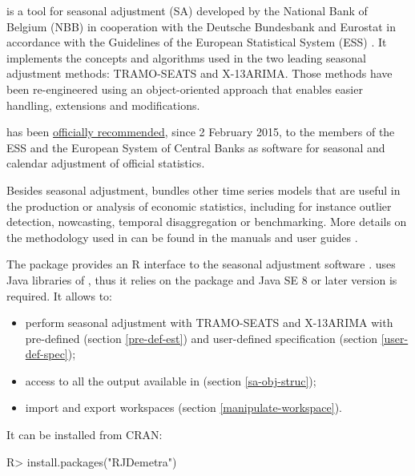 \documentclass[article]{jss}
\providecommand{\tightlist}{%
  \setlength{\itemsep}{0pt}\setlength{\parskip}{0pt}}
\begin{document}
 is a tool for seasonal adjustment (SA) developed by
the National Bank of Belgium (NBB) in cooperation with the Deutsche
Bundesbank and Eurostat in accordance with the Guidelines of the
European Statistical System (ESS) \citep{eurostat2015guidelines}. It
implements the concepts and algorithms used in the two leading seasonal
adjustment methods: TRAMO-SEATS and X-13ARIMA. Those methods have been
re-engineered using an object-oriented approach that enables easier
handling, extensions and modifications.

 has been
\href{https://ec.europa.eu/eurostat/cros/system/files/Jdemetra_\%20release.pdf}{officially
recommended}, since 2 February 2015, to the members of the ESS and the
European System of Central Banks as software for seasonal and calendar
adjustment of official statistics.

Besides seasonal adjustment,  bundles other time
series models that are useful in the production or analysis of economic
statistics, including for instance outlier detection, nowcasting,
temporal disaggregation or benchmarking. More details on the methodology
used in  can be found in the 
manuals and user guides
\citep{grudkowska2015jdemetrarm, grudkowska2015jdemetraug}.

The package  \citep{RJDemetra} provides an R interface to
the seasonal adjustment software . 
uses Java libraries of , thus it relies on the
 \citep{rJava} package and Java SE 8 or later version is
required. It allows to:

\begin{itemize}
\tightlist
\item
  perform seasonal adjustment with TRAMO-SEATS and X-13ARIMA with
  pre-defined (section \ref{pre-def-est}) and user-defined specification
  (section \ref{user-def-spec});\\
\item
  access to all the output available in  (section
  \ref{sa-obj-struc});\\
\item
  import and export  workspaces (section
  \ref{manipulate-workspace}).
\end{itemize}

It can be installed from CRAN:

\begin{CodeChunk}

\begin{CodeInput}
R> install.packages("RJDemetra")
\end{CodeInput}
\end{CodeChunk}
\end{document}
